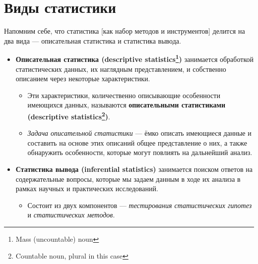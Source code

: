 \documentclass[
  letterpaper,
  DIV=11,
  numbers=noendperiod]{scrreprt}
\providecommand{\tightlist}{%
  \setlength{\itemsep}{0pt}\setlength{\parskip}{0pt}}\usepackage{longtable,booktabs,array}
\newcommand{\Cline}[2][red]{{\sbox\MBox{$#2$}%
  \rlap{\usebox\MBox}\color{#1}\rule[-1.2\dp\MBox]{\wd\MBox}{0.5pt}}}
\newcommand{\norm}{\mathcal{N}}
\newcommand{\def}{\overset{\text{def}}{=}}
\newcommand{\sgn}{\mathrm{sgn}}
\newcommand{\artanh}{\text{artanh}}
\newcommand{\median}{\mathrm{median}}
\newcommand{\mean}{\mathbb{M}}
\newcommand{\skew}{\mathrm{skew}}
\newcommand{\kurt}{\mathrm{kurt}}
\theoremstyle{definition}
\theoremstyle{remark}
\begin{document}
\newsavebox{\MBox}
\newcommand{\Cline}[2][red]{{\sbox\MBox{$#2$}%
  \rlap{\usebox\MBox}\color{#1}\rule[-1.2\dp\MBox]{\wd\MBox}{0.5pt}}}

\newcommand{\norm}{\mathcal{N}}

\newcommand{\def}{\overset{\text{def}}{=}}
\newcommand{\sgn}{\text{sgn}}

\usepackage{amsmath}
\DeclareMathOperator\artanh{artanh}

\newcommand{\median}{\text{median}}
\newcommand{\mean}{\mathbb{M}}
\newcommand{\skew}{\mathrm{skew}}
\newcommand{\kurt}{\mathrm{kurt}}

\section{Виды статистики}\label{andan-descriptives-kinds-of-stats}

Напомним себе, что статистика {[}как набор методов и инструментов{]}
делится на два вида --- описательная статистика и статистика вывода.

\begin{itemize}
\tightlist
\item
  \textbf{Описательная статистика (descriptive statistics\footnote{Mass
    (uncountable) noun})} занимается обработкой статистических данных,
  их наглядным представлением, и собственно описанием через некоторые
  характеристики.

  \begin{itemize}
  \tightlist
  \item
    Эти характеристики, количественно описывающие особенности имеющихся
    данных, называются \textbf{описательными статистиками (descriptive
    statistics\footnote{Countable noun, plural in this case})}.
  \item
    \emph{Задача описательной статистики} --- ёмко описать имеющиеся
    данные и составить на основе этих описаний общее представление о
    них, а также обнаружить особенности, которые могут повлиять на
    дальнейший анализ.
  \end{itemize}
\item
  \textbf{Статистика вывода (inferential statistics)} занимается поиском
  ответов на содержательные вопросы, которые мы задаем данным в ходе их
  анализа в рамках научных и практических исследований.

  \begin{itemize}
  \tightlist
  \item
    Состоит из двух компонентов --- \emph{тестирования статистических
    гипотез} и \emph{статистических методов}.
  \end{itemize}
\end{itemize}
\end{document}
